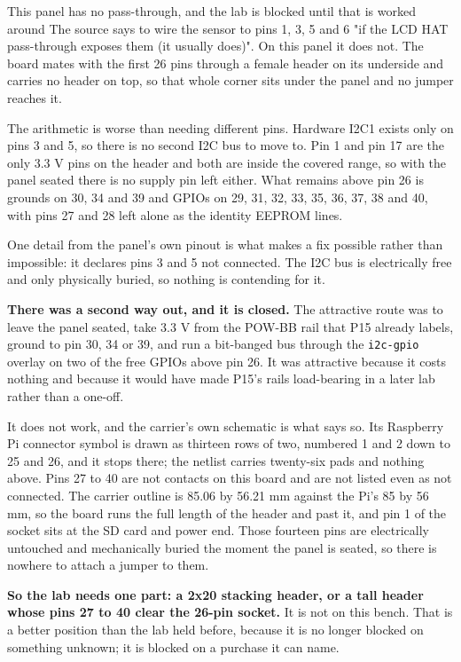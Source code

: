 \begin{note}{This panel has no pass-through, and the lab is blocked until that is worked around}
The source says to wire the sensor to pins 1, 3, 5 and 6 "if the LCD HAT pass-through exposes them (it usually does)". On this panel it does not. The board mates with the first 26 pins through a female header on its underside and carries no header on top, so that whole corner sits under the panel and no jumper reaches it.

The arithmetic is worse than needing different pins. Hardware I2C1 exists only on pins 3 and 5, so there is no second I2C bus to move to. Pin 1 and pin 17 are the only 3.3 V pins on the header and both are inside the covered range, so with the panel seated there is no supply pin left either. What remains above pin 26 is grounds on 30, 34 and 39 and GPIOs on 29, 31, 32, 33, 35, 36, 37, 38 and 40, with pins 27 and 28 left alone as the identity EEPROM lines.

One detail from the panel's own pinout is what makes a fix possible rather than impossible: it declares pins 3 and 5 not connected. The I2C bus is electrically free and only physically buried, so nothing is contending for it.

\textbf{There was a second way out, and it is closed.} The attractive route was to leave the panel seated, take 3.3 V from the POW-BB rail that P15 already labels, ground to pin 30, 34 or 39, and run a bit-banged bus through the \texttt{i2c-gpio} overlay on two of the free GPIOs above pin 26. It was attractive because it costs nothing and because it would have made P15's rails load-bearing in a later lab rather than a one-off.

It does not work, and the carrier's own schematic is what says so. Its Raspberry Pi connector symbol is drawn as thirteen rows of two, numbered 1 and 2 down to 25 and 26, and it stops there; the netlist carries twenty-six pads and nothing above. Pins 27 to 40 are not contacts on this board and are not listed even as not connected. The carrier outline is 85.06 by 56.21 mm against the Pi's 85 by 56 mm, so the board runs the full length of the header and past it, and pin 1 of the socket sits at the SD card and power end. Those fourteen pins are electrically untouched and mechanically buried the moment the panel is seated, so there is nowhere to attach a jumper to them.

\textbf{So the lab needs one part: a 2x20 stacking header, or a tall header whose pins 27 to 40 clear the 26-pin socket.} It is not on this bench. That is a better position than the lab held before, because it is no longer blocked on something unknown; it is blocked on a purchase it can name.


\end{note}
